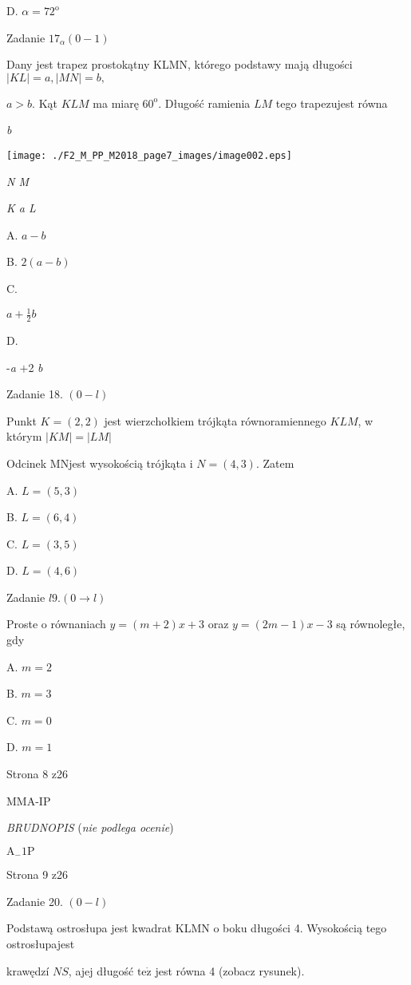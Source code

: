 \documentclass[a4paper,12pt]{article}
\begin{document}
D. $\alpha=72^{\mathrm{o}}$

Zadanie $17_{\alpha}(0-1)$

Dany jest trapez prostokątny KLMN, którego podstawy mają długości $|KL|=a, |MN|=b,$

$a>b$. Kąt $KLM$ ma miarę $60^{\mathrm{o}}$. Długość ramienia $LM$ tego trapezujest równa

{\it b}
\begin{center}
\texttt{[image: ./F2\_M\_PP\_M2018\_page7\_images/image002.eps]}
\end{center}
{\it N  M}

{\it K  a  L}

A. $a-b$

B. $2(a-b)$

C.

$a+\displaystyle \frac{1}{2}b$

D.

-{\it a} $+$2 {\it b}

Zadanie 18. $(0-l)$

Punkt $K=(2,2)$ jest wierzchołkiem trójkąta równoramiennego $KLM$, w którym $|KM|=|LM|$

Odcinek MNjest wysokością trójkąta i $N=(4,3)$. Zatem

A. $L=(5,3)$

B. $L=(6,4)$

C. $L=(3,5)$

D. $L=(4,6)$

Zadanie $l9. (0\rightarrow l)$

Proste o równaniach $y=(m+2)x+3$ oraz $y=(2m-1)x-3$ są równoległe, gdy

A. $m=2$

B. $m=3$

C. $m=0$

D. $m=1$

Strona 8 z26

MMA-IP





{\it BRUDNOPIS} ({\it nie podlega ocenie})

$\mathrm{A}_{-}1\mathrm{P}$

Strona 9 z26





Zadanie 20. $(0-l)$

Podstawą ostrosłupa jest kwadrat KLMN o boku długości 4. Wysokością tego ostrosłupajest

krawędzí $NS$, ajej długość $\mathrm{t}\mathrm{e}\dot{\mathrm{z}}$ jest równa 4 (zobacz rysunek).
\end{document}

